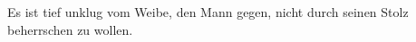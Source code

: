 Es ist tief unklug vom Weibe, den Mann gegen, nicht durch seinen Stolz beherrschen zu wollen.
\par

